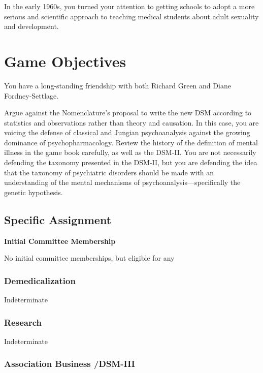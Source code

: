 \begin{refsection}
In the early 1960s, you turned your attention to getting schools to adopt a more serious and scientific approach to teaching medical students about adult sexuality and development.

\section{Game Objectives}
\label{gameobjectives}

You have a long-standing friendship with both Richard Green and Diane Fordney-Settlage.

Argue against the Nomenclature's proposal to write the new DSM according to statistics and observations rather than theory and causation. In this case, you are voicing the defense of classical and Jungian psychoanalysis against the growing dominance of psychopharmacology. Review the history of the definition of mental illness in the game book carefully, as well as the DSM-II. You are not necessarily defending the taxonomy presented in the DSM-II, but you are defending the idea that the taxonomy of psychiatric disorders should be made with an understanding of the mental mechanisms of psychoanalysis—specifically the genetic hypothesis.

\subsection{Specific Assignment}
\label{specificassignment}

\textbf{Initial Committee Membership}

No initial committee memberships, but eligible for any

\subsubsection{Demedicalization}
\label{demedicalization}

Indeterminate

\subsubsection{Research}
\label{research}

Indeterminate

\subsubsection{Association Business \slash  DSM-III}
\label{associationbusinessdsm-iii}


\end{refsection}
